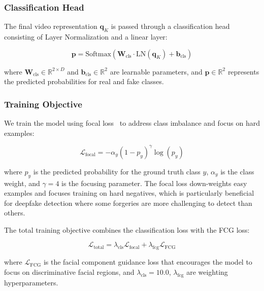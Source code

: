 \subsubsection{Classification Head}

The final video representation $\mathbf{q}_K$ is passed through a classification head consisting of Layer Normalization and a linear layer:

\begin{equation}
\mathbf{p} = \text{Softmax}(\mathbf{W}_{\text{cls}} \cdot \text{LN}(\mathbf{q}_K) + \mathbf{b}_{\text{cls}})
\end{equation}

where $\mathbf{W}_{\text{cls}} \in \mathbb{R}^{2 \times D}$ and $\mathbf{b}_{\text{cls}} \in \mathbb{R}^2$ are learnable parameters, and $\mathbf{p} \in \mathbb{R}^2$ represents the predicted probabilities for real and fake classes.

\subsubsection{Training Objective}

We train the model using focal loss~\cite{lin2017focal} to address class imbalance and focus on hard examples:

\begin{equation}
\mathcal{L}_{\text{focal}} = -\alpha_y (1 - p_y)^\gamma \log(p_y)
\end{equation}

where $p_y$ is the predicted probability for the ground truth class $y$, $\alpha_y$ is the class weight, and $\gamma=4$ is the focusing parameter. The focal loss down-weights easy examples and focuses training on hard negatives, which is particularly beneficial for deepfake detection where some forgeries are more challenging to detect than others.

The total training objective combines the classification loss with the FCG loss:

\begin{equation}
\mathcal{L}_{\text{total}} = \lambda_{\text{cls}} \mathcal{L}_{\text{focal}} + \lambda_{\text{fcg}} \mathcal{L}_{\text{FCG}}
\end{equation}

where $\mathcal{L}_{\text{FCG}}$ is the facial component guidance loss that encourages the model to focus on discriminative facial regions, and $\lambda_{\text{cls}}=10.0$, $\lambda_{\text{fcg}}$ are weighting hyperparameters.

